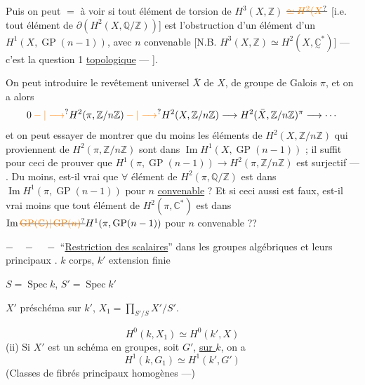 Puis on peut $=$  à voir si tout élément de torsion de $H^3(X,\mathbb{Z})$ $\deleted{\unsure{\simeq H^2(X}}$ \deleted{\unsure{$\delta$}} [i.e. tout élément de $\partial(H^2(X,\mathbb{Q}/\mathbb{Z}))$] est l'obstruction d'un élément d'un $H^1(X,\operatorname{GP}(n-1))$, avec $n$ convenable [N.B. $H^3(X,\mathbb{Z})\simeq H^2(X,\underset{\sim}{\mathbb{C}}^*)$] --- c'est la question 1 \uline{topologique} --- ].

On peut introduire le revêtement universel $\bar X$ de $X$, de groupe de Galois $\pi$, et on a alors
\[
0\unsure{{}-{ }|\longrightarrow}H^2(\pi,\mathbb{Z}/n\mathbb{Z})\unsure{{}-{ }|\longrightarrow}H^2(X,\mathbb{Z}/n\mathbb{Z})\longrightarrow H^2(\bar X,\mathbb{Z}/n\mathbb{Z})^\pi\longrightarrow\cdots
\]
et on peut essayer de montrer que du moins les éléments de $H^2(X,\mathbb{Z}/n\mathbb{Z})$ qui proviennent de $H^2(\pi,\mathbb{Z}/n\mathbb{Z})$ sont dans $\operatorname{Im}H^1(X,\operatorname{GP}(n-1))$ ;  il suffit pour ceci de prouver que $H^1(\pi,\operatorname{GP}(n-1))\to H^2(\pi,\mathbb{Z}/n\mathbb{Z})$ est surjectif --- . Du moins, est-il vrai que $\forall$ élément de $H^2(\pi,\mathbb{Q}/\mathbb{Z})$ est dans $\operatorname{Im}H^1(\pi,\operatorname{GP}(n-1))$ pour $n$ \uline{convenable} ?
Et si ceci aussi est faux, est-il  vrai  moins que tout élément de $H^2(\pi,\mathbb{C}^*)$ est dans $\operatorname{Im}\deleted{\unsure{\operatorname{GP}(\mathbb{C})|\operatorname{GP}(n)}}H^1(\pi,\operatorname{GP}(n-1))$ pour $n$ convenable ??

\noindent $-\quad-\quad-$
\margin{]}
``\uline{Restriction des scalaires}'' dans les groupes algébriques et leurs  principaux .
$k$ corps, $k'$ extension finie

$S=\operatorname{Spec}k$, $S'=\operatorname{Spec}k'$


 $X'$ préschéma sur $k'$, $X_1=\prod_{S'/S}X'/S'$.

\[
\boxed{H^0(k,X_1)\simeq H^0(k',X)}\tag*{(i)}
\]
(ii) Si $X'$ est un schéma en groupes, soit $G'$, \uline{ sur $k$}, on a
\[
\boxed{H^1(k,G_1)\simeq H^1(k',G')}
\]
(Classes de fibrés principaux homogènes ---)


